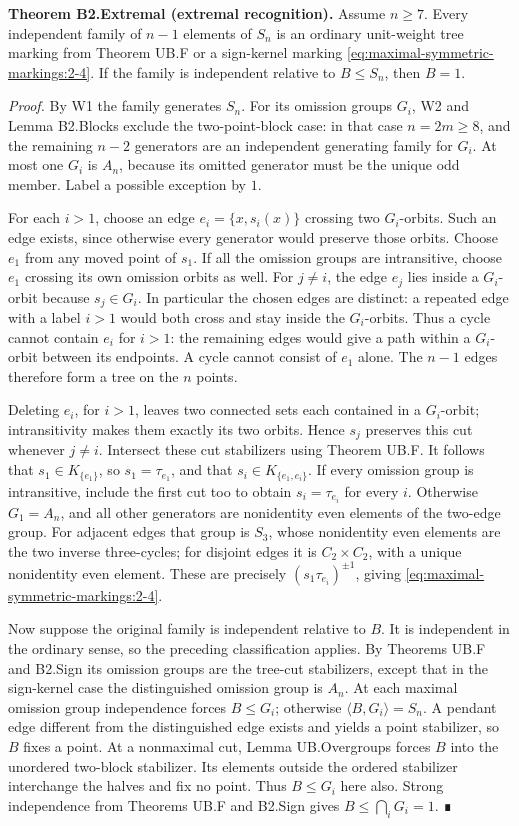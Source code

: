 \textbf{Theorem B2.Extremal (extremal recognition).} Assume \(n\geq7\). Every independent family of \(n-1\) elements of \(S_n\) is an ordinary unit-weight tree marking from Theorem UB.F or a sign-kernel marking \eqref{eq:maximal-symmetric-markings:2-4}. If the family is independent relative to \(B\leq S_n\), then \(B=1\).

\emph{Proof.} By W1 the family generates \(S_n\). For its omission groups \(G_i\), W2 and Lemma B2.Blocks exclude the two-point-block case: in that case \(n=2m\geq8\), and the remaining \(n-2\) generators are an independent generating family for \(G_i\). At most one \(G_i\) is \(A_n\), because its omitted generator must be the unique odd member. Label a possible exception by \(1\).

For each \(i>1\), choose an edge \(e_i=\{x,s_i(x)\}\) crossing two \(G_i\)-orbits. Such an edge exists, since otherwise every generator would preserve those orbits. Choose \(e_1\) from any moved point of \(s_1\). If all the omission groups are intransitive, choose \(e_1\) crossing its own omission orbits as well. For \(j\ne i\), the edge \(e_j\) lies inside a \(G_i\)-orbit because \(s_j\in G_i\). In particular the chosen edges are distinct: a repeated edge with a label \(i>1\) would both cross and stay inside the \(G_i\)-orbits. Thus a cycle cannot contain \(e_i\) for \(i>1\): the remaining edges would give a path within a \(G_i\)-orbit between its endpoints. A cycle cannot consist of \(e_1\) alone. The \(n-1\) edges therefore form a tree on the \(n\) points.

Deleting \(e_i\), for \(i>1\), leaves two connected sets each contained in a \(G_i\)-orbit; intransitivity makes them exactly its two orbits. Hence \(s_j\) preserves this cut whenever \(j\ne i\). Intersect these cut stabilizers using Theorem UB.F. It follows that \(s_1\in K_{\{e_1\}}\), so \(s_1=\tau_{e_1}\), and that \(s_i\in K_{\{e_1,e_i\}}\). If every omission group is intransitive, include the first cut too to obtain \(s_i=\tau_{e_i}\) for every \(i\). Otherwise \(G_1=A_n\), and all other generators are nonidentity even elements of the two-edge group. For adjacent edges that group is \(S_3\), whose nonidentity even elements are the two inverse three-cycles; for disjoint edges it is \(C_2\times C_2\), with a unique nonidentity even element. These are precisely \((s_1\tau_{e_i})^{\pm1}\), giving \eqref{eq:maximal-symmetric-markings:2-4}.

Now suppose the original family is independent relative to \(B\). It is independent in the ordinary sense, so the preceding classification applies. By Theorems UB.F and B2.Sign its omission groups are the tree-cut stabilizers, except that in the sign-kernel case the distinguished omission group is \(A_n\). At each maximal omission group independence forces \(B\leq G_i\); otherwise \(\langle B,G_i\rangle=S_n\). A pendant edge different from the distinguished edge exists and yields a point stabilizer, so \(B\) fixes a point. At a nonmaximal cut, Lemma UB.Overgroups forces \(B\) into the unordered two-block stabilizer. Its elements outside the ordered stabilizer interchange the halves and fix no point. Thus \(B\leq G_i\) here also. Strong independence from Theorems UB.F and B2.Sign gives \(B\leq\bigcap_iG_i=1\). ∎

